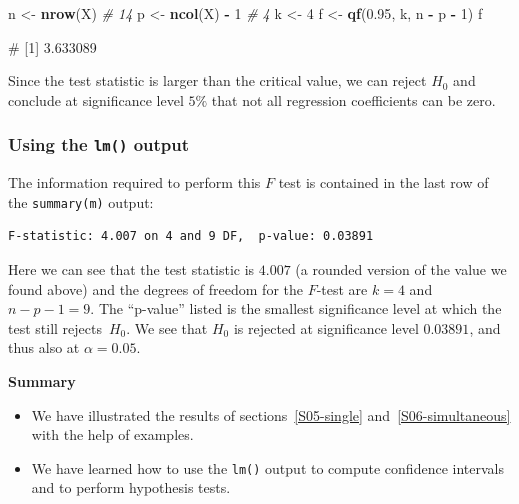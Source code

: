 \documentclass[
  a4paper,
]{article}
\newenvironment{Shaded}{\begin{snugshade}}{\end{snugshade}}
\newcommand{\CommentTok}[1]{\textcolor[rgb]{0.56,0.35,0.01}{\textit{#1}}}
\newcommand{\DecValTok}[1]{\textcolor[rgb]{0.00,0.00,0.81}{#1}}
\newcommand{\FloatTok}[1]{\textcolor[rgb]{0.00,0.00,0.81}{#1}}
\newcommand{\FunctionTok}[1]{\textcolor[rgb]{0.13,0.29,0.53}{\textbf{#1}}}
\newcommand{\NormalTok}[1]{#1}
\newcommand{\OtherTok}[1]{\textcolor[rgb]{0.56,0.35,0.01}{#1}}
\newcommand{\SpecialCharTok}[1]{\textcolor[rgb]{0.81,0.36,0.00}{\textbf{#1}}}
\providecommand{\tightlist}{%
  \setlength{\itemsep}{0pt}\setlength{\parskip}{0pt}}
\theoremstyle{definition}
\theoremstyle{definition}
\theoremstyle{definition}
\theoremstyle{definition}
\theoremstyle{remark}
\begin{document}
\begin{Shaded}
\begin{Highlighting}[]
\NormalTok{n }\OtherTok{\textless{}{-}} \FunctionTok{nrow}\NormalTok{(X)      }\CommentTok{\# 14}
\NormalTok{p }\OtherTok{\textless{}{-}} \FunctionTok{ncol}\NormalTok{(X) }\SpecialCharTok{{-}} \DecValTok{1}  \CommentTok{\# 4}
\NormalTok{k }\OtherTok{\textless{}{-}} \DecValTok{4}
\NormalTok{f }\OtherTok{\textless{}{-}} \FunctionTok{qf}\NormalTok{(}\FloatTok{0.95}\NormalTok{, k, n }\SpecialCharTok{{-}}\NormalTok{ p }\SpecialCharTok{{-}} \DecValTok{1}\NormalTok{)}
\NormalTok{f}
\end{Highlighting}
\end{Shaded}

\begin{Shaded}
\begin{Highlighting}[]
\NormalTok{\# [1] 3.633089}
\end{Highlighting}
\end{Shaded}

Since the test statistic is larger than the critical value, we can
reject \(H_0\) and conclude at significance level \(5\%\) that not
all regression coefficients can be zero.

\subsubsection{\texorpdfstring{Using the \texttt{lm()} output}{Using the lm() output}}\label{using-the-lm-output}

The information required to perform this \(F\) test is contained
in the last row of the \texttt{summary(m)} output:

\begin{verbatim}
F-statistic: 4.007 on 4 and 9 DF,  p-value: 0.03891
\end{verbatim}

Here we can see that the test statistic is \(4.007\) (a rounded version
of the value we found above) and the degrees of freedom for the \(F\)-test
are \(k = 4\) and \(n - p - 1 = 9\). The ``p-value'' listed is the smallest
significance level at which the test still rejects~\(H_0\).
We see that \(H_0\) is rejected at significance level \(0.03891\),
and thus also at \(\alpha=0.05\).

\textbf{Summary}

\begin{itemize}
\tightlist
\item
  We have illustrated the results of sections~\ref{S05-single}
  and~\ref{S06-simultaneous} with the help of examples.
\item
  We have learned how to use the \texttt{lm()} output to compute confidence
  intervals and to perform hypothesis tests.
\end{itemize}
\end{document}
